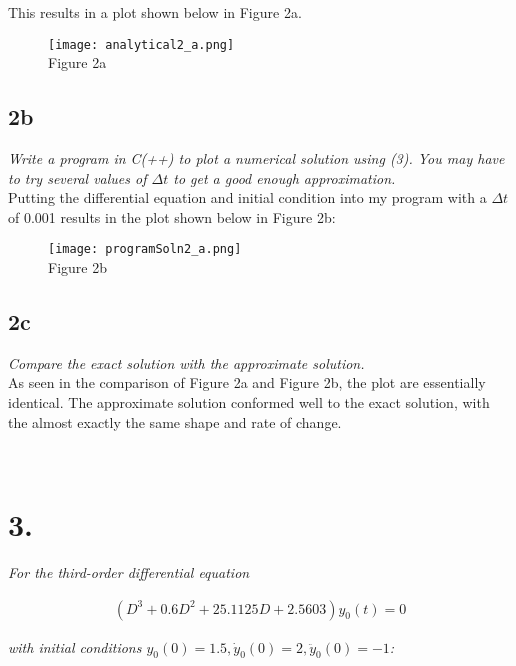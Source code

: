 \documentclass[10pt, AMS Euler]{article}
\begin{document}
This results in a plot shown below in Figure 2a. 

\begin{figure}[H]
    \centering
    \texttt{[image: analytical2\_a.png]}\\
    Figure 2a
\end{figure}

\subsection*{2b}
\textit{Write a program in C(++) to plot a numerical solution using (3). You may have to try several
values of $\Delta t$ to get a good enough approximation.}\\

Putting the differential equation and initial condition into my program with a $\Delta t$ of 0.001 results in the plot shown below in Figure 2b:

\begin{figure}[H]
    \centering
    \texttt{[image: programSoln2\_a.png]}\\
    Figure 2b
\end{figure}

\subsection*{2c}
\textit{Compare the exact solution with the approximate solution.}\\

As seen in the comparison of Figure 2a and Figure 2b, the plot are essentially identical. The approximate solution conformed well to the exact solution, with the almost exactly the same shape and rate of change.

\noindent \underline{\hspace{7in}}\\
\section*{3.}
\textit{For the third-order differential equation}
\begin{center}
    \begin{align*}
        (D^3 + 0.6D^2 + 25.1125D + 2.5603)y_0(t) = 0
    \end{align*}
\end{center}

\textit{with initial conditions $y_0(0) = 1.5, \dot{y}_0(0) = 2, \ddot{y}_0(0) = -1$:}
\end{document}
